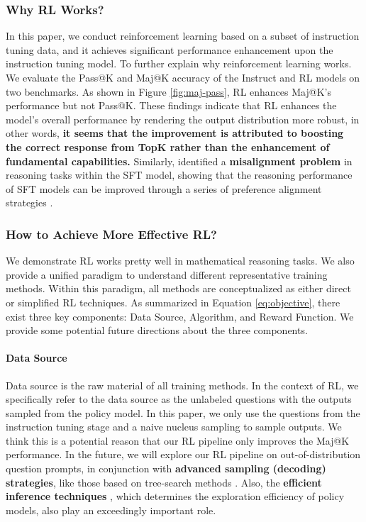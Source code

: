 \subsubsection{Why RL Works?}
In this paper, we conduct reinforcement learning based on a subset of instruction tuning data, and it achieves significant performance enhancement upon the instruction tuning model. To further explain why reinforcement learning works.
We evaluate the Pass@K and Maj@K accuracy of the Instruct and RL models on two benchmarks.
As shown in Figure \ref{fig:maj-pass}, RL enhances Maj@K’s performance but not Pass@K. These findings indicate that RL enhances the model's overall performance by rendering the output distribution more robust, in other words, \textbf{it seems that the improvement is attributed to boosting the correct response from TopK rather than the enhancement of fundamental capabilities.} Similarly, \citep{wang2023making} identified a \textbf{misalignment problem} in reasoning tasks within the SFT model, showing that the reasoning performance of SFT models can be improved through a series of preference alignment strategies \citep{yuan2023rrhf,song2023preference,wang2023making}.


\subsubsection{How to Achieve More Effective RL?}
\label{sec:effec_rl}
We demonstrate RL works pretty well in mathematical reasoning tasks. We also provide a unified paradigm to understand different representative training methods.
Within this paradigm, all methods are conceptualized as either direct or simplified  RL techniques. 
As summarized in Equation \ref{eq:objective}, there exist three key components: Data Source, Algorithm, and Reward Function. We provide some potential future directions about the three components.


\paragraph{Data Source} Data source is the raw material of all training methods.
In the context of RL, we specifically refer to the data source as the unlabeled questions with the outputs sampled from the policy model. In this paper, we only use the questions from the instruction tuning stage and a naive nucleus sampling to sample outputs. We think this is a potential reason that 
our RL pipeline only improves the Maj@K performance. In the future, we will explore our RL pipeline on out-of-distribution question prompts, in conjunction with \textbf{advanced sampling (decoding) strategies}, like those based on tree-search methods \citep{yao2023tree}.
Also, the  \textbf{efficient inference techniques} \citep{xia-etal-2023-speculative,leviathan2023fast,kwon2023efficient,xia2024unlocking}, which determines the exploration efficiency of policy models, also play an exceedingly important role.



